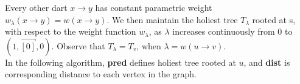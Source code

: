 \documentclass{article}
\begin{document}
Every other dart $x \rightarrow y$ has constant parametric weight 
$w_{\lambda}(x \rightarrow y) = w(x \rightarrow y)$.
We then maintain the holiest tree $T_{\lambda}$ rooted at s, with respect
to the weight function $w_{\lambda}$, as $\lambda$ increases continuously from
0 to $( 1, \vec{[0]}, 0 )$. Observe that $T_{\lambda} = T_v$, when $\lambda = w(u \rightarrow v)$. \\

In the following algorithm, \textbf{pred} defines holiest tree rooted at $u$, and 
\textbf{dist} is corresponding distance to each vertex in the graph. \\

\end{document}
